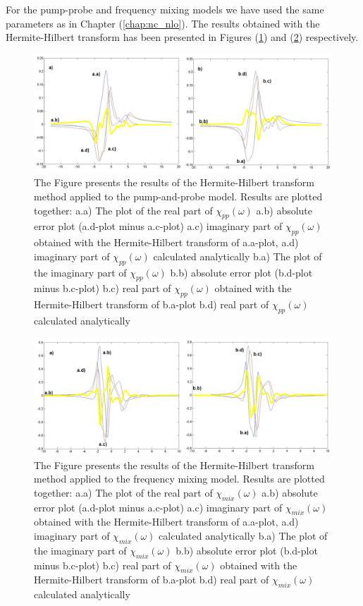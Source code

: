 \documentclass[12pt,twoside,a4paper]{article}
\numberwithin{equation}{subsection}
\numberwithin{figure}{subsection}
\begin{document}
For the pump-probe and frequency mixing models we have used the same parameters as in Chapter (\ref{chap:nc_nlo}). The results
obtained with the Hermite-Hilbert transform has been presented in Figures (\ref{fig:hht_pnp}) and (\ref{fig:hht_fmix})
respectively.

\begin{figure} 
  \includegraphics[width=150mm]{img/hht_pnp.png}
  \caption{ The Figure presents the results of the Hermite-Hilbert transform method applied to the pump-and-probe model. Results are
  plotted together: 
     a.a) The plot of the real part of ${\chi_{pp}}(\omega )$
     a.b) absolute error plot (a.d-plot minus a.c-plot)
     a.c) imaginary part of ${\chi_{pp}}(\omega )$ obtained with the Hermite-Hilbert transform of a.a-plot, 
     a.d) imaginary part of ${\chi_{pp}}(\omega )$ calculated analytically 
     b.a) The plot of the imaginary part of ${\chi_{pp}}(\omega )$ 
     b.b) absolute error plot (b.d-plot minus b.c-plot)
     b.c) real part of ${\chi_{pp}}(\omega )$ obtained with the Hermite-Hilbert transform of b.a-plot 
     b.d) real part of $\chi_{pp} (\omega )$ calculated analytically 
     \label{fig:hht_pnp}
     }
\end{figure} 

\begin{figure} 
  \includegraphics[width=150mm]{img/hht_fmix.png}
  \caption{The Figure presents the results of the Hermite-Hilbert transform method applied to the frequency mixing model. Results are
  plotted together:
     a.a) The plot of the real part of ${\chi_{mix}}(\omega )$
     a.b) absolute error plot (a.d-plot minus a.c-plot)
     a.c) imaginary part of ${\chi_{mix}}(\omega )$ obtained with the Hermite-Hilbert transform of a.a-plot, 
     a.d) imaginary part of ${\chi_{mix}}(\omega )$ calculated analytically 
     b.a) The plot of the imaginary part of ${\chi_{mix}}(\omega )$ 
     b.b) absolute error plot (b.d-plot minus b.c-plot)
     b.c) real part of ${\chi_{mix}}(\omega )$ obtained with the Hermite-Hilbert transform of b.a-plot  
     b.d) real part of $\chi_{mix} (\omega )$ calculated analytically 
     \label{fig:hht_fmix}
     }
\end{figure}
\end{document}
